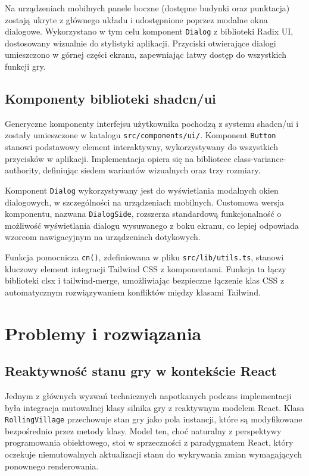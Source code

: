 \documentclass[12pt, a4paper]{article}
\begin{document}
Na urządzeniach mobilnych panele boczne (dostępne budynki oraz punktacja) zostają ukryte z głównego układu i udostępnione poprzez modalne okna dialogowe. Wykorzystano w tym celu komponent \texttt{Dialog} z biblioteki Radix UI, dostosowany wizualnie do stylistyki aplikacji. Przyciski otwierające dialogi umieszczono w górnej części ekranu, zapewniając łatwy dostęp do wszystkich funkcji gry.

\subsection{Komponenty biblioteki shadcn/ui}

Generyczne komponenty interfejsu użytkownika pochodzą z systemu shadcn/ui i zostały umieszczone w katalogu \texttt{src/components/ui/}. Komponent \texttt{Button} stanowi podstawowy element interaktywny, wykorzystywany do wszystkich przycisków w aplikacji. Implementacja opiera się na bibliotece class-variance-authority, definiując siedem wariantów wizualnych oraz trzy rozmiary.

Komponent \texttt{Dialog} wykorzystywany jest do wyświetlania modalnych okien dialogowych, w szczególności na urządzeniach mobilnych. Customowa wersja komponentu, nazwana \texttt{DialogSide}, rozszerza standardową funkcjonalność o możliwość wyświetlania dialogu wysuwanego z boku ekranu, co lepiej odpowiada wzorcom nawigacyjnym na urządzeniach dotykowych.

Funkcja pomocnicza \texttt{cn()}, zdefiniowana w pliku \texttt{src/lib/utils.ts}, stanowi kluczowy element integracji Tailwind CSS z komponentami. Funkcja ta łączy biblioteki clsx i tailwind-merge, umożliwiając bezpieczne łączenie klas CSS z automatycznym rozwiązywaniem konfliktów między klasami Tailwind.

\section{Problemy i rozwiązania}

\subsection{Reaktywność stanu gry w kontekście React}

Jednym z głównych wyzwań technicznych napotkanych podczas implementacji była integracja mutowalnej klasy silnika gry z reaktywnym modelem React. Klasa \texttt{RollingVillage} przechowuje stan gry jako pola instancji, które są modyfikowane bezpośrednio przez metody klasy. Model ten, choć naturalny z perspektywy programowania obiektowego, stoi w sprzeczności z paradygmatem React, który oczekuje niemutowalnych aktualizacji stanu do wykrywania zmian wymagających ponownego renderowania.
\end{document}
